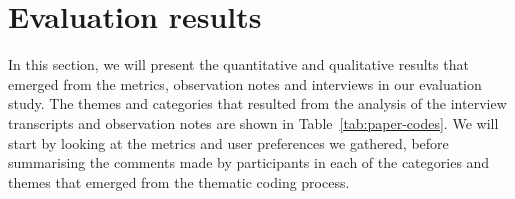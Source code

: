 



\section{Evaluation results}\label{sec:paper-results}

In this section, we will present the quantitative and qualitative results that emerged from the metrics, observation
notes and interviews in our evaluation study.  The themes and categories that resulted from the analysis of the
interview transcripts and observation notes are shown in Table~\ref{tab:paper-codes}.  We will start by looking at the
metrics and user preferences we gathered, before summarising the comments made by participants in each of the
categories and themes that emerged from the thematic coding process.

